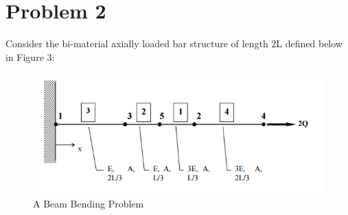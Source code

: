\documentclass[a4paper]{article}
\begin{document}
\pagebreak

\section*{Problem 2}

Consider the bi-material axially loaded bar structure of length 2L defined below in Figure 3:

\begin{figure}[ht]
\centering
\includegraphics[scale=1.0]{AE370HWP2.PNG}
\caption{A Beam Bending Problem}
\end{figure}
\end{document}

